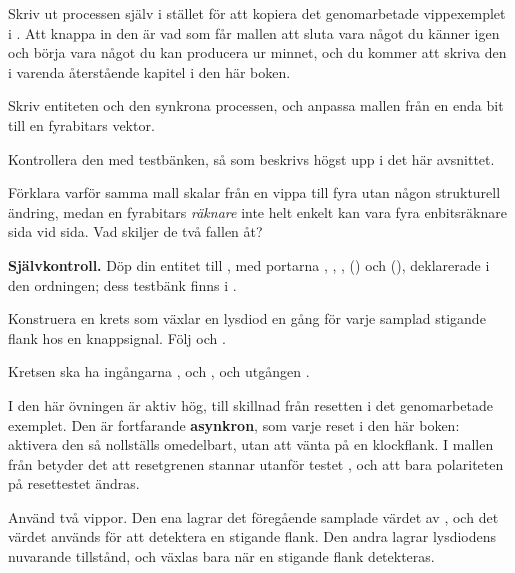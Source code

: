 Skriv ut processen själv i stället för att kopiera det genomarbetade vippexemplet i
. Att knappa in den är vad som får mallen att sluta vara något du känner
igen och börja vara något du kan producera ur minnet, och du kommer att skriva den i varenda
återstående kapitel i den här boken.

 Skriv entiteten och den synkrona processen, och anpassa mallen från en enda bit till en
fyrabitars vektor.

 Kontrollera den med testbänken, så som beskrivs högst upp i det här avsnittet.

 Förklara varför samma mall skalar från en vippa till fyra utan någon strukturell ändring,
medan en fyrabitars \emph{räknare} inte helt enkelt kan vara fyra enbitsräknare sida vid sida. Vad
skiljer de två fallen åt?


\begin{selfcheck}
\textbf{Självkontroll.} Döp din entitet till , med portarna ,
, ,  () och 
(), deklarerade i den ordningen; dess testbänk finns i
.
\end{selfcheck}


\label{c3:ex:edgehand}
Konstruera en krets som växlar en lysdiod en gång för varje samplad stigande flank hos en
knappsignal. Följ  och .

Kretsen ska ha ingångarna ,  och , och utgången .

I den här övningen är  aktiv hög, till skillnad från resetten i det genomarbetade
exemplet. Den är fortfarande \textbf{asynkron}, som varje reset i den här boken: aktivera den så
nollställs  omedelbart, utan att vänta på en klockflank. I mallen från
 betyder det att resetgrenen stannar utanför testet
, och att bara polariteten på resettestet ändras.

Använd två vippor. Den ena lagrar det föregående samplade värdet av , och det värdet
används för att detektera en stigande flank. Den andra lagrar lysdiodens nuvarande tillstånd, och
växlas bara när en stigande flank detekteras.

